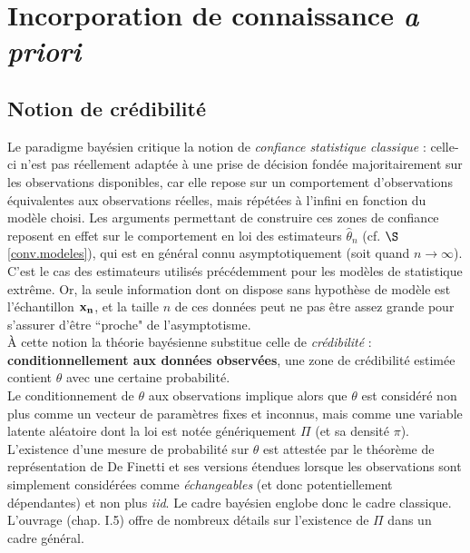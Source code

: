 \section{Incorporation de connaissance {\it a priori}}\label{incorporation}



\subsection{Notion de crédibilité}\label{credibilite}

Le paradigme bay\'esien critique la notion de {\it confiance statistique classique} : celle-ci n'est pas r\'eellement adapt\'ee \`a une prise de d\'ecision fond\'ee majoritairement sur les observations disponibles, car elle repose sur un comportement d'observations \'equivalentes aux observations r\'eelles, mais r\'ep\'et\'ees \`a l'infini en fonction du mod\`ele choisi. Les arguments permettant de construire ces zones de confiance reposent en effet sur le { comportement en loi} des estimateurs $\hat\theta_n$ (cf. $\S$ \ref{conv.modeles}), qui est en g\'en\'eral connu { asymptotiquement}  (soit quand $n\to\infty$). C'est le cas des estimateurs utilis\'es pr\'ec\'edemment pour les mod\`eles de statistique extr\^eme. Or, la seule information dont on dispose sans hypoth\`ese de mod\`ele est l'\'echantillon ${\bf x_n}$, et la taille $n$ de ces donn\'ees peut ne pas \^etre assez grande pour s'assurer d'\^etre ``proche" de l'asymptotisme. \\

\`A cette notion la th\'eorie bay\'esienne substitue celle de {\it cr\'edibilit\'e}  : {\bf conditionnellement aux donn\'ees observ\'ees}, une zone de cr\'edibilit\'e estim\'ee contient $\theta$ avec une certaine probabilit\'e. \\

Le conditionnement de $\theta$ aux observations implique alors que $\theta$ est consid\'er\'e non plus comme un vecteur de param\`etres fixes et inconnus, mais comme une variable latente al\'eatoire dont la loi est not\'ee g\'en\'eriquement $\Pi$ (et sa densit\'e $\pi$). L'existence d'une mesure de probabilit\'e sur $\theta$ est attest\'ee par le th\'eor\`eme de repr\'esentation de De Finetti  et ses versions \'etendues  \cite{ONeill2011} lorsque les observations sont simplement consid\'er\'ees comme {\it \'echangeables} (et donc potentiellement d\'ependantes) et non plus {\it iid}. Le cadre bay\'esien englobe donc le cadre classique. %
L'ouvrage \cite{Press2003} (chap. I.5) offre de nombreux d\'etails sur l'existence de $\Pi$ dans un cadre g\'en\'eral. \\

